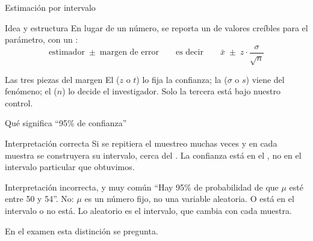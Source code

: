\documentclass[aspectratio=169,10pt]{beamer}
\begin{document}

\begin{frame}{Estimación por intervalo}
  \begin{block}{Idea y estructura}
    \small
    En lugar de un número, se reporta un  de valores creíbles
    para el parámetro, con un :
    \[ \text{estimador} \;\pm\; \text{margen de error}
       \qquad\text{es decir}\qquad
       \bar{x} \;\pm\; z\cdot\frac{\sigma}{\sqrt{n}} \]
  \end{block}

  \vspace{0.2cm}
  \begin{alertblock}{Las tres piezas del margen}
    \footnotesize
    El  ($z$ o $t$) lo fija la confianza; la
     ($\sigma$ o $s$) viene del fenómeno; el  ($n$) lo decide el investigador. Solo la tercera está bajo nuestro
    control.
  \end{alertblock}
\end{frame}

\begin{frame}{Qué significa ``95\% de confianza''}
  \begin{alertblock}{Interpretación correcta}
    \footnotesize
    Si se repitiera el muestreo muchas veces y en cada muestra se construyera
    su intervalo, cerca del . La confianza está en el , no en el intervalo
    particular que obtuvimos.
  \end{alertblock}

  \vspace{0.2cm}
  \begin{block}{Interpretación incorrecta, y muy común}
    \footnotesize
    ``Hay 95\% de probabilidad de que $\mu$ esté entre 50 y 54''. No: $\mu$
    es un número fijo, no una variable aleatoria. O está en el intervalo o no
    está. Lo aleatorio es el intervalo, que cambia con cada muestra.
  \end{block}

  \vspace{0.15cm}
  {\footnotesize\color{uniGris} En el examen esta distinción se pregunta.}
\end{frame}
\end{document}
